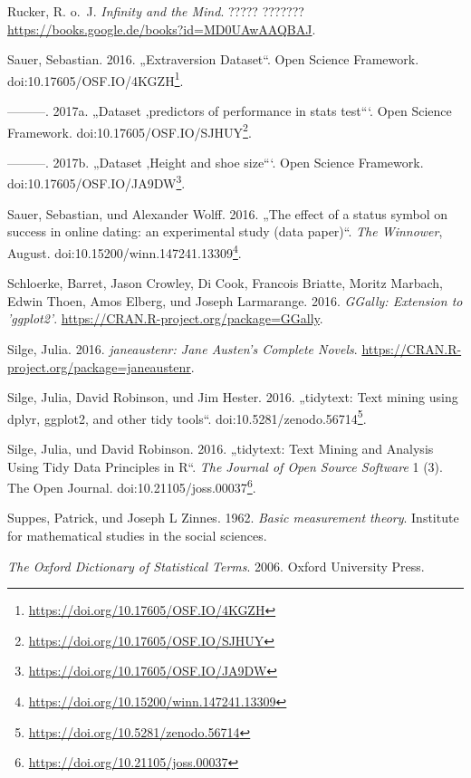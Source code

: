 \documentclass[12pt,ngerman,]{book}
\let\rmarkdownfootnote\footnote%
\def\footnote{\protect\rmarkdownfootnote}
\renewcommand{\href}[2]{#2\footnote{\url{#1}}}
\begin{document}
\hypertarget{ref-ruckerinfinity}{}
Rucker, R. o.~J. \emph{Infinity and the Mind}. ????? ???????
\url{https://books.google.de/books?id=MD0UAwAAQBAJ}.

\hypertarget{ref-Sauer_2016}{}
Sauer, Sebastian. 2016. „Extraversion Dataset``. Open Science Framework.
doi:\href{https://doi.org/10.17605/OSF.IO/4KGZH}{10.17605/OSF.IO/4KGZH}.

\hypertarget{ref-Sauer_2017}{}
---------. 2017a. „Dataset ‚predictors of performance in stats test```.
Open Science Framework.
doi:\href{https://doi.org/10.17605/OSF.IO/SJHUY}{10.17605/OSF.IO/SJHUY}.

\hypertarget{ref-Sauer_2017a}{}
---------. 2017b. „Dataset ‚Height and shoe size```. Open Science
Framework.
doi:\href{https://doi.org/10.17605/OSF.IO/JA9DW}{10.17605/OSF.IO/JA9DW}.

\hypertarget{ref-sauer_wolff}{}
Sauer, Sebastian, und Alexander Wolff. 2016. „The effect of a status
symbol on success in online dating: an experimental study (data
paper)``. \emph{The Winnower}, August.
doi:\href{https://doi.org/10.15200/winn.147241.13309}{10.15200/winn.147241.13309}.

\hypertarget{ref-R-GGally}{}
Schloerke, Barret, Jason Crowley, Di Cook, Francois Briatte, Moritz
Marbach, Edwin Thoen, Amos Elberg, und Joseph Larmarange. 2016.
\emph{GGally: Extension to 'ggplot2'}.
\url{https://CRAN.R-project.org/package=GGally}.

\hypertarget{ref-R-janeaustenr}{}
Silge, Julia. 2016. \emph{janeaustenr: Jane Austen's Complete Novels}.
\url{https://CRAN.R-project.org/package=janeaustenr}.

\hypertarget{ref-tidytext-archive}{}
Silge, Julia, David Robinson, und Jim Hester. 2016. „tidytext: Text
mining using dplyr, ggplot2, and other tidy tools``.
doi:\href{https://doi.org/10.5281/zenodo.56714}{10.5281/zenodo.56714}.

\hypertarget{ref-Silge2016}{}
Silge, Julia, und David Robinson. 2016. „tidytext: Text Mining and
Analysis Using Tidy Data Principles in R``. \emph{The Journal of Open
Source Software} 1 (3). The Open Journal.
doi:\href{https://doi.org/10.21105/joss.00037}{10.21105/joss.00037}.

\hypertarget{ref-suppes1962basic}{}
Suppes, Patrick, und Joseph L Zinnes. 1962. \emph{Basic measurement
theory}. Institute for mathematical studies in the social sciences.

\hypertarget{ref-oxford}{}
\emph{The Oxford Dictionary of Statistical Terms}. 2006. Oxford
University Press.
\end{document}
